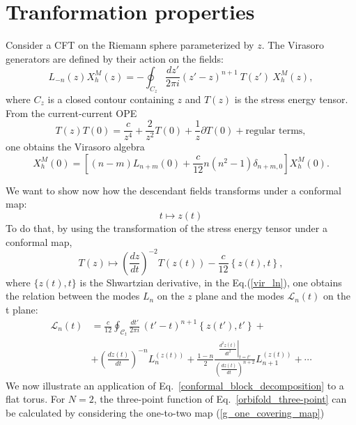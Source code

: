 \documentclass[a4paper,11pt]{article}
\begin{document}
\appendix
\section{Tranformation properties}\label{app_ward}

Consider a CFT on the Riemann sphere parameterized by $z$.
The Virasoro generators are defined by their action on the fields:
\begin{equation}
\label{vir_ln}
 L_{-n}(z)X^{M}_h(z)=-\oint_{C_{z}}\frac{dz'}{2\pi i}(z'-z)^{n+1}~T(z')~X^{M}_h(z),
\end{equation}
where $C_{z}$ is a closed contour containing $z$ and $T(z)$ is the stress energy tensor. 
From the current-current OPE
\begin{equation}
T(z) T(0)= \frac{c}{z^4}+ \frac{2}{z^2} T(0)+\frac{1}{z}\partial T (0)+\text{regular terms},
\end{equation} 
one obtains the  Virasoro algebra
\begin{equation}
 [L_n(0), L_{m}(0)]X^{M}_h(0) =\left[(n-m) L_{n+m}(0)+\frac{c}{12}n(n^2-1)\delta_{n+m, 0}\right]X^{M}_h(0).
\end{equation}

We want to show now how the descendant fields transforms under a conformal map:
\begin{equation}
t \mapsto z(t)
\end{equation}
To do that, by using the transformation of the stress energy tensor under a conformal map,
\begin{equation}
T(z)\mapsto \left(\frac{d z}{d t}\right)^{-2} T(z(t))-\frac{c}{12}\left\{z(t),t\right\},
\end{equation}
where $\{z(t),t\}$ is the Shwartzian derivative,  in the Eq.(\ref{vir_ln}), one obtains the relation between the modes $L_{n}$ on the $z$ plane and the modes $\mathcal{L}_n(t)$ on the t plane:
\begin{equation}\label{gengen}
\begin{aligned}
 \mathcal{L}_{n}(t)&=\frac{c}{12} \oint_{\mathcal{C}_t}\frac{d t'}{2\pi i}\, (t'-t)^{n+1}\left\{z(t'),t'\right\} +\\
 & +\left(\frac{d z(t)}{d t}\right)^{-n} L_n^{(z(t))}
 +\frac{1-n}{2}\frac{\left.\frac{d^2 z(t)}{d t^2}\right|_{t=t'}}{\left(\frac{d z(t)}{d t}\right)^{n+2}}L_{n+1}^{(z(t))}+\cdots
 \end{aligned}
\end{equation}
We now illustrate an application of Eq.~\eqref{conformal_block_decomposition} to a flat torus. For $N=2$, the three-point function of Eq.~\eqref{orbifold_three-point} 
can be calculated by considering the  one-to-two map (\ref{g_one_covering_map})
\end{document}
